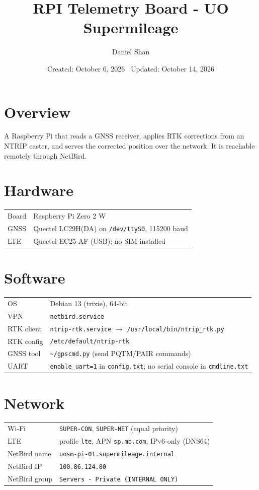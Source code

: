 \documentclass{article}
\title{RPI Telemetry Board - UO Supermileage}
\author{Daniel Shan}
\date{Created: October 6, 2026 \ Updated: October 14, 2026}
\begin{document}
\maketitle

\section{Overview}
A Raspberry Pi that reads a GNSS receiver, applies RTK corrections from an NTRIP caster,
and serves the corrected position over the network. It is reachable remotely through NetBird.

\section{Hardware}
\begin{tabular}{@{}ll@{}}
\toprule
Board & Raspberry Pi Zero 2 W \\
GNSS  & Quectel LC29H(DA) on \texttt{/dev/ttyS0}, 115200 baud \\
LTE   & Quectel EC25-AF (USB); no SIM installed \\
\bottomrule
\end{tabular}

\section{Software}
\begin{tabular}{@{}ll@{}}
\toprule
OS              & Debian 13 (trixie), 64-bit \\
VPN             & \texttt{netbird.service} \\
RTK client      & \texttt{ntrip-rtk.service} $\rightarrow$ \texttt{/usr/local/bin/ntrip\_rtk.py} \\
RTK config      & \texttt{/etc/default/ntrip-rtk} \\
GNSS tool       & \texttt{\textasciitilde/gpscmd.py} (send PQTM/PAIR commands) \\
UART            & \texttt{enable\_uart=1} in \texttt{config.txt}; no serial console in \texttt{cmdline.txt} \\
\bottomrule
\end{tabular}

\section{Network}
\begin{tabular}{@{}ll@{}}
\toprule
Wi-Fi           & \texttt{SUPER-CON}, \texttt{SUPER-NET} (equal priority) \\
LTE             & profile \texttt{lte}, APN \texttt{sp.mb.com}, IPv6-only (DNS64) \\
NetBird name    & \texttt{uosm-pi-01.supermileage.internal} \\
NetBird IP      & \texttt{100.86.124.80} \\
NetBird group   & \texttt{Servers - Private (INTERNAL ONLY)} \\
\bottomrule
\end{tabular}
\end{document}
